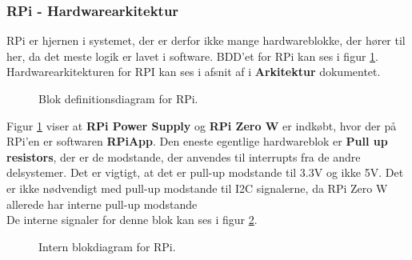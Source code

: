 \documentclass[Rapport/Rapport_main.tex]{subfiles}
\begin{document}
\subsubsection{RPi - Hardwarearkitektur}
RPi er hjernen i systemet, der er derfor ikke mange hardwareblokke, der hører til her, da det meste logik er lavet i software. BDD'et for RPi kan ses i figur \ref{fig:rap_rpi_hardware_bdd}. Hardwarearkitekturen for RPI kan ses i afsnit  af i \textbf{Arkitektur} dokumentet. 
\begin{figure}[H]
    \centering
    \caption{Blok definitionsdiagram for RPi.}
    \label{fig:rap_rpi_hardware_bdd}
\end{figure}
Figur \ref{fig:rap_rpi_hardware_bdd} viser at \textbf{RPi Power Supply} og \textbf{RPi Zero W} er indkøbt, hvor der på RPi'en er softwaren \textbf{RPiApp}. Den eneste egentlige hardwareblok er \textbf{Pull up resistors}, der er de modstande, der anvendes til interrupts fra de andre delsystemer. Det er vigtigt, at det er pull-up modstande til 3.3V og ikke 5V. Det er ikke nødvendigt med pull-up modstande til I2C signalerne, da RPi Zero W allerede har interne pull-up modstande \autocite{RPiPins}  \\
De interne signaler for denne blok kan ses i figur \ref{fig:rap_rpi_hardware_ibd}.
\begin{figure}[H]
    \centering
    \caption{Intern blokdiagram for RPi.}
    \label{fig:rap_rpi_hardware_ibd}
\end{figure}
\end{document}
